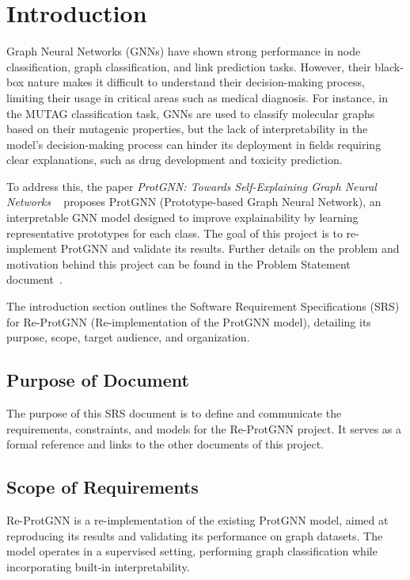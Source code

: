 \documentclass[12pt]{article}
\begin{document}
\section{Introduction}

Graph Neural Networks (GNNs) have shown strong performance in node classification, graph classification, and link prediction tasks. However, their black-box
nature makes it difficult to understand their decision-making process, limiting
their usage in critical areas such as medical diagnosis. For instance, in the MUTAG classification task, GNNs are used to classify molecular graphs based on their mutagenic properties, but the lack of interpretability in the model's decision-making process can hinder its deployment in fields requiring clear explanations, such as drug development and toxicity prediction.

To address this, the paper \textit{ProtGNN: Towards Self-Explaining Graph Neural Networks} ~\citep{zhang2022} proposes ProtGNN (Prototype-based Graph Neural Network), an interpretable GNN model designed to improve explainability by learning representative prototypes for each class. The goal of this project is to re-implement ProtGNN and validate its results. Further details on the problem and motivation behind this project can be found in the Problem Statement document~\citep{yuanqi2025protgnn}.

The introduction section outlines the Software Requirement Specifications (SRS) for Re-ProtGNN (Re-implementation of the ProtGNN model), detailing its purpose, scope, target audience, and organization.

\subsection{Purpose of Document}
The purpose of this SRS document is to define and communicate the requirements, constraints, and models for the Re-ProtGNN project. It serves as a formal reference and links to the other documents of this project.


\subsection{Scope of Requirements} 
Re-ProtGNN is a re-implementation of the existing ProtGNN model, aimed at reproducing its results and validating its performance on graph datasets. The model operates in a supervised setting, performing graph classification while incorporating built-in interpretability. 
\end{document}
